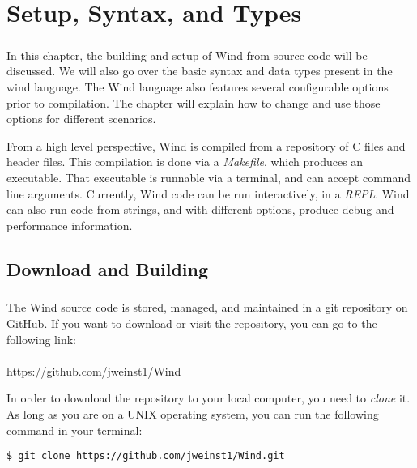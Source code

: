 
\chapter{Setup, Syntax, and Types}

\paragraph{  } In this chapter, the building and setup of Wind from source code will be discussed. We will also go over the basic syntax and data types present in the wind language. The Wind language also features several configurable options prior to compilation. The chapter will explain how to change and use those options for different scenarios.
\par From a high level perspective, Wind is compiled from a repository of C files and header files. This compilation is done via a \emph{Makefile}, which produces an executable. That executable is runnable via a terminal, and can accept command line arguments. Currently, Wind code can be run interactively, in a \emph{REPL}. Wind can also run code from strings, and with different options, produce debug and performance information.

\section{Download and Building}

\paragraph{  } The Wind source code is stored, managed, and maintained in a git repository on GitHub. If you want to download or visit the repository, you can go to the following link: \\
\\
\url{https://github.com/jweinst1/Wind}

\par In order to download the repository to your local computer, you need to \emph{clone} it. As long as you are on a UNIX operating system, you can run the following command in your terminal:

\begin{verbatim}
$ git clone https://github.com/jweinst1/Wind.git
\end{verbatim}

